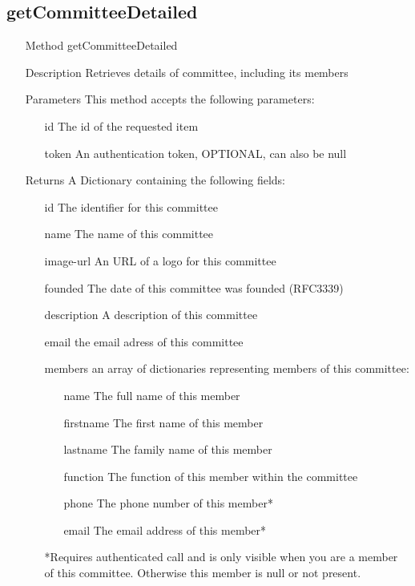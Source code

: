 \documentclass[a4paper]{scrreprt}
\begin{document}
\subsection{getCommitteeDetailed}
\begin{enumerate}
\item[Method] getCommitteeDetailed
\item[Description] Retrieves details of committee, including its members
\item[Parameters] This method accepts the following parameters:
	\begin{enumerate}
    	\item[id] The id of the requested item
    	\item[token] An authentication token, OPTIONAL, can also be null
    \end{enumerate}
\item[Returns] A Dictionary containing the following fields:
\begin{enumerate}
    \item[id] The identifier for this committee
    \item[name] The name of this committee
    \item[image-url] An URL of a logo for this committee
    \item[founded] The  date of this committee was founded (RFC3339)
    \item[description] A description of this committee
    \item[email] the email adress of this committee
    \item[members] an array of dictionaries representing members of this committee:
    	\begin{enumerate}
        \item[name] The full name of this member
        \item[firstname] The first name of this member
        \item[lastname] The family name of this member
        \item[function] The function of this member within the committee
        \item[phone] The phone number of this member*
        \item[email] The email address of this member*
        \end{enumerate}
        *Requires authenticated call and is only visible when you are a member of this committee. Otherwise this member is null or not present.
	\end{enumerate}

\end{enumerate}
\end{document}
